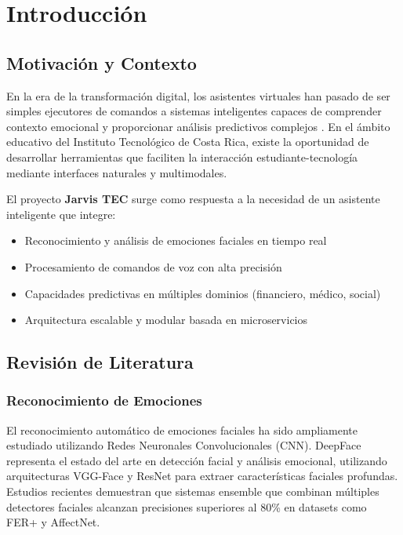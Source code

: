 
\chapter{Introducción}
\label{chap:intro}
\pagestyle{fancy}

\section{Motivación y Contexto}

En la era de la transformación digital, los asistentes virtuales han pasado de ser simples ejecutores de comandos a sistemas inteligentes capaces de comprender contexto emocional y proporcionar análisis predictivos complejos \cite{lopez2020virtual}. En el ámbito educativo del Instituto Tecnológico de Costa Rica, existe la oportunidad de desarrollar herramientas que faciliten la interacción estudiante-tecnología mediante interfaces naturales y multimodales.

El proyecto \textbf{Jarvis TEC} surge como respuesta a la necesidad de un asistente inteligente que integre:
\begin{itemize}
    \item Reconocimiento y análisis de emociones faciales en tiempo real
    \item Procesamiento de comandos de voz con alta precisión
    \item Capacidades predictivas en múltiples dominios (financiero, médico, social)
    \item Arquitectura escalable y modular basada en microservicios
\end{itemize}

\section{Revisión de Literatura}

\subsection{Reconocimiento de Emociones}

El reconocimiento automático de emociones faciales ha sido ampliamente estudiado utilizando Redes Neuronales Convolucionales (CNN). DeepFace \cite{serengil2020deepface} representa el estado del arte en detección facial y análisis emocional, utilizando arquitecturas VGG-Face y ResNet para extraer características faciales profundas. Estudios recientes \cite{mollahosseini2017affectnet} demuestran que sistemas ensemble que combinan múltiples detectores faciales alcanzan precisiones superiores al 80\% en datasets como FER+ y AffectNet.

